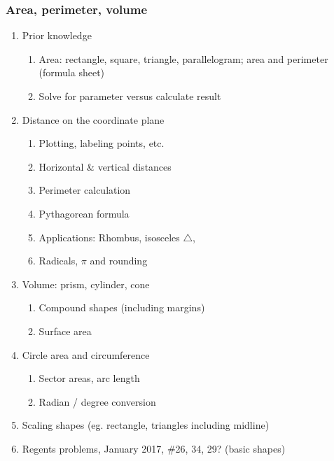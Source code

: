 \documentclass[12pt, twoside]{article}
\begin{document}
\subsubsection*{Area, perimeter, volume}
  \begin{enumerate}
    \item Prior knowledge
      \begin{enumerate}
        \item Area: rectangle, square, triangle, parallelogram; area and perimeter (formula sheet)
        \item Solve for parameter versus calculate result
      \end{enumerate}

    \item Distance on the coordinate plane
      \begin{enumerate}
        \item Plotting, labeling points, etc.
        \item Horizontal \& vertical distances
        \item Perimeter calculation
        \item Pythagorean formula
        \item Applications: Rhombus, isosceles $\triangle$,
        \item Radicals, $\pi$ and rounding
      \end{enumerate}

    \item Volume: prism, cylinder, cone
      \begin{enumerate}
        \item Compound shapes (including margins)
        \item Surface area
      \end{enumerate}

    \item Circle area and circumference
      \begin{enumerate}
        \item Sector areas, arc length
        \item Radian / degree conversion
      \end{enumerate}

    \item Scaling shapes (eg. rectangle, triangles including midline)

    \item Regents problems, January 2017, \#26, 34, 29? (basic shapes)
  \end{enumerate}
\end{document}
